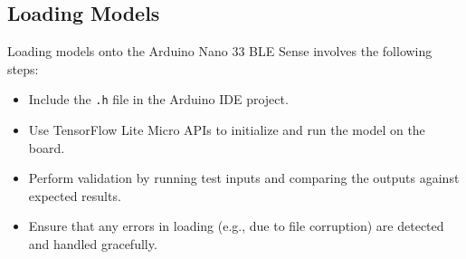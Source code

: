 \subsection{Loading Models}
Loading models onto the Arduino Nano 33 BLE Sense involves the following steps:
\begin{itemize}
	\item Include the \texttt{.h} file in the Arduino IDE project.
	\item Use TensorFlow Lite Micro APIs to initialize and run the model on the board.
	\item Perform validation by running test inputs and comparing the outputs against expected results.
	\item Ensure that any errors in loading (e.g., due to file corruption) are detected and handled gracefully.
\end{itemize}

